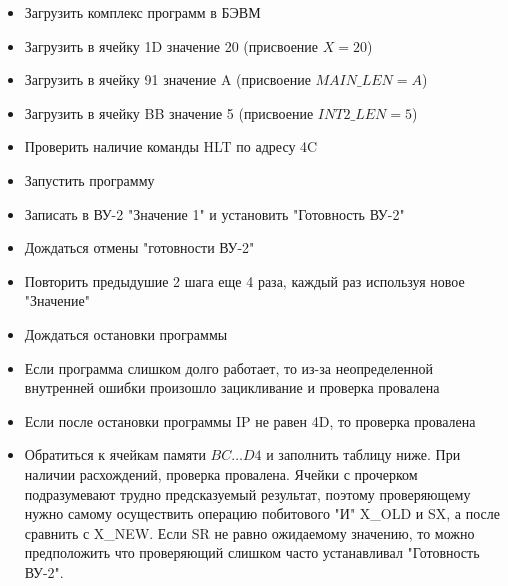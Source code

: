 \begin{itemize}
	\item Загрузить комплекс программ в БЭВМ
	\item Загрузить в ячейку 1D значение 20 (присвоение $ X = 20 $)
	\item Загрузить в ячейку 91 значение A (присвоение $ MAIN\_LEN = A $)
	\item Загрузить в ячейку BB значение 5 (присвоение $ INT2\_LEN = 5 $)
	\item Проверить наличие команды HLT по адресу 4C
	\item Запустить программу
	\item Записать в ВУ-2 "Значение 1" и установить "Готовность ВУ-2"
	\item Дождаться отмены "готовности ВУ-2"
	\item Повторить предыдушие 2 шага еще 4 раза, каждый раз используя новое "Значение"
	\item Дождаться остановки программы
	\item Если программа слишком долго работает, то из-за неопределенной внутренней ошибки произошло зацикливание и проверка провалена
	\item Если после остановки программы IP не равен 4D, то проверка провалена
	\item Обратиться к ячейкам памяти $ BC\ldots D4 $ и заполнить таблицу ниже. При наличии расхождений, проверка провалена. Ячейки с прочерком подразумевают трудно предсказуемый результат, поэтому проверяющему нужно самому осуществить операцию побитового "И" X\_OLD и SX, а после сравнить с X\_NEW. Если SR не равно ожидаемому значению, то можно предположить что проверяющий слишком часто устанавливал "Готовность ВУ-2".
\end{itemize}

